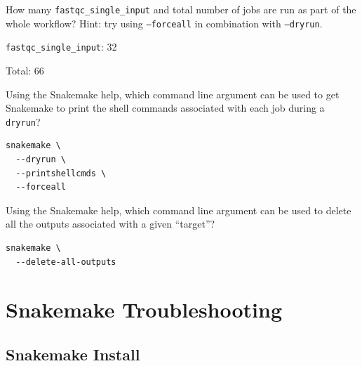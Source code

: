\begin{questions}

How many \texttt{fastqc\_single\_input} and total number of jobs are run as part of the whole workflow? Hint: try using \texttt{--forceall} in combination
with \texttt{--dryrun}.

\begin{answer}

\texttt{fastqc\_single\_input}: 32

Total: 66

\end{answer}

Using the Snakemake help, which command line argument can be used to get Snakemake to print the shell commands associated with each job during a \texttt{dryrun}?

\begin{answer}

\begin{lstlisting}
snakemake \
  --dryrun \
  --printshellcmds \
  --forceall
\end{lstlisting}

\end{answer}

Using the Snakemake help, which command line argument can be used to delete all the outputs associated with a given ``target''?

\begin{answer}

\begin{lstlisting}
snakemake \
  --delete-all-outputs
\end{lstlisting}

\end{answer}

\end{questions}



%
%
%


\section{Snakemake Troubleshooting}
\label{sec:snake_trouble}

\subsection{Snakemake Install}

